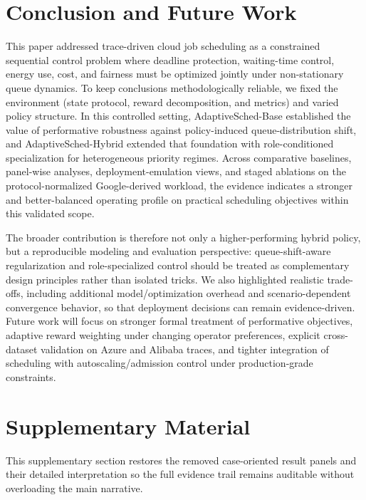 \documentclass[journal]{IEEEtran}
\begin{document}
\section{\textbf{Conclusion and Future Work}} \label{Sec6}
This paper addressed trace-driven cloud job scheduling as a constrained sequential control problem where deadline protection, waiting-time control, energy use, cost, and fairness must be optimized jointly under non-stationary queue dynamics. To keep conclusions methodologically reliable, we fixed the environment (state protocol, reward decomposition, and metrics) and varied policy structure. In this controlled setting, AdaptiveSched-Base established the value of performative robustness against policy-induced queue-distribution shift, and AdaptiveSched-Hybrid extended that foundation with role-conditioned specialization for heterogeneous priority regimes. Across comparative baselines, panel-wise analyses, deployment-emulation views, and staged ablations on the protocol-normalized Google-derived workload, the evidence indicates a stronger and better-balanced operating profile on practical scheduling objectives within this validated scope.

The broader contribution is therefore not only a higher-performing hybrid policy, but a reproducible modeling and evaluation perspective: queue-shift-aware regularization and role-specialized control should be treated as complementary design principles rather than isolated tricks. We also highlighted realistic trade-offs, including additional model/optimization overhead and scenario-dependent convergence behavior, so that deployment decisions can remain evidence-driven. Future work will focus on stronger formal treatment of performative objectives, adaptive reward weighting under changing operator preferences, explicit cross-dataset validation on Azure and Alibaba traces, and tighter integration of scheduling with autoscaling/admission control under production-grade constraints.




\clearpage
\section*{Supplementary Material}
This supplementary section restores the removed case-oriented result panels and their detailed interpretation so the full evidence trail remains auditable without overloading the main narrative.
\end{document}
